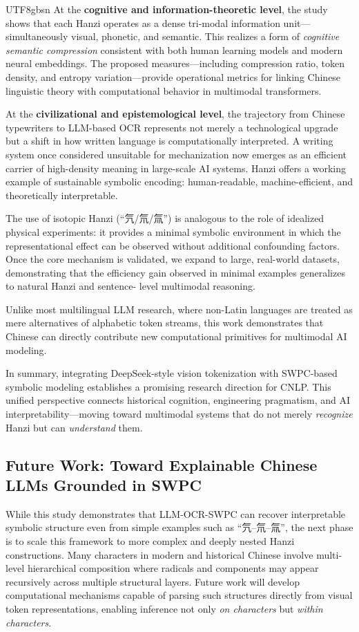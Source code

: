 \documentclass[conference]{IEEEtran}
\begin{document}
\begin{CJK*}{UTF8}{gbsn}
At the \textbf{cognitive and information-theoretic level}, the study shows that each Hanzi operates as a dense tri-modal information unit—simultaneously visual, phonetic, and semantic. This realizes a form of \emph{cognitive semantic compression} consistent with both human learning models and modern neural embeddings. The proposed measures—including compression ratio, token density, and entropy variation—provide operational metrics for linking Chinese linguistic theory with computational behavior in multimodal transformers.

At the \textbf{civilizational and epistemological level}, the trajectory from Chinese typewriters to LLM-based OCR represents not merely a technological upgrade but a shift in how written language is computationally interpreted. A writing system once considered unsuitable for mechanization now emerges as an efficient carrier of high-density meaning in large-scale AI systems. Hanzi offers a working example of sustainable symbolic encoding: human-readable, machine-efficient, and theoretically interpretable.

The use of isotopic Hanzi (“氕/氘/氚”) is analogous to the role of
idealized physical experiments: it provides a minimal symbolic environment
in which the representational effect can be observed without additional
confounding factors. Once the core mechanism is validated, we expand to
large, real-world datasets, demonstrating that the efficiency gain
observed in minimal examples generalizes to natural Hanzi and sentence-
level multimodal reasoning.

Unlike most multilingual LLM research, where non-Latin languages are treated as mere alternatives of alphabetic token streams, this work demonstrates that Chinese can directly contribute new computational primitives for multimodal AI modeling.

In summary, integrating DeepSeek-style vision tokenization with SWPC-based symbolic modeling establishes a promising research direction for CNLP. This unified perspective connects historical cognition, engineering pragmatism, and AI interpretability—moving toward multimodal systems that do not merely \textit{recognize} Hanzi but can \textit{understand} them.

\subsection{Future Work: Toward Explainable Chinese LLMs Grounded in SWPC}
\label{sec:futurework}
While this study demonstrates that LLM-OCR-SWPC can recover interpretable symbolic structure even from simple examples such as ``氕–氘–氚'', the next phase is to scale this framework to more complex and deeply nested Hanzi constructions. Many characters in modern and historical Chinese involve multi-level hierarchical composition  where radicals and components may appear recursively across multiple structural layers. Future work will develop computational mechanisms capable of parsing such structures directly from visual token representations, enabling inference not only \emph{on characters} but \emph{within characters}.


\end{CJK*}
\end{document}
